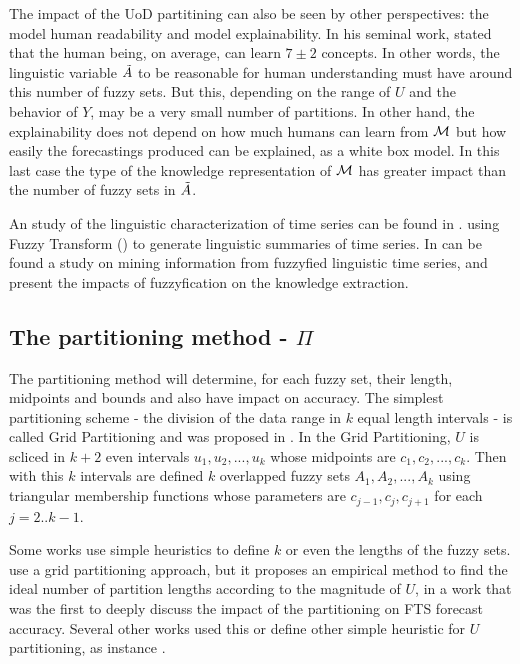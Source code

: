 The impact of the UoD partitining can also be seen by other perspectives: the model human readability and model explainability. In his seminal work, \cite{Miller1956} stated that the human being, on average, can learn $7 \pm 2$ concepts. In other words, the linguistic variable $\tilde{A}$ to be reasonable for human understanding must have around this number of fuzzy sets. But this, depending on the range of $U$ and the behavior of $Y$, may be a very small number of partitions. In other hand, the explainability does not depend on how much humans can learn from $\mathcal{M}$ but how easily the forecastings produced can be explained, as a white box model. In this last case the type of the knowledge representation of $\mathcal{M}$ has greater impact than the number of fuzzy sets in $\tilde{A}$. 

An study of the linguistic characterization of time series can be found in \cite{Novak2016}. using Fuzzy Transform (\cite{Perfilieva2006}) to generate linguistic summaries of time series. In \cite{Novak2016a} can be found a study on mining information from fuzzyfied linguistic time series, and present the impacts of fuzzyfication on the knowledge extraction.

%
\subsection{The partitioning method - $\Pi$}
\label{sec:fts_partitioningmethod}

The partitioning method will determine, for each fuzzy set,  their length, midpoints and bounds and also have impact on accuracy. The simplest partitioning scheme -  the division of the data range in $k$ equal length intervals - is called Grid Partitioning and was proposed in \cite{song1993fuzzy}.  In the Grid Partitioning, $U$ is scliced in $k+2$ even intervals $u_1, u_2, ..., u_k$ whose midpoints are $c_1, c_2, ..., c_k$. Then with this $k$ intervals are defined  $k$  overlapped fuzzy sets $A_1,A_2,...,A_k$ using triangular membership functions whose parameters are $c_{j-1},c_j,c_{j+1}$ for each $j = 2..k-1$. 

Some works use simple heuristics to define $k$ or even the lengths of the fuzzy sets. \cite{huarng2001effective} use a grid partitioning approach, but it proposes an empirical method to find the ideal number of partition lengths according to the magnitude of $U$, in a work that was the first to deeply discuss the impact of the partitioning on FTS forecast accuracy. Several other works used this or define other simple heuristic for $U$ partitioning, as instance \cite{Chang1997, huarng2005type, Rubio2016, Cheng2018}.

